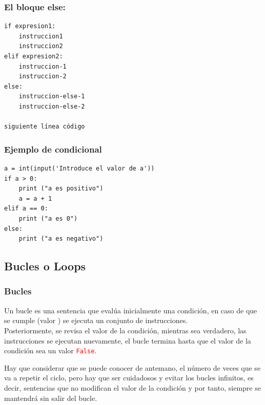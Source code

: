 \begin{frame}[fragile]
\frametitle{El bloque else:}
\begin{verbatim}
if expresion1:
    instruccion1
    instruccion2
elif expresion2:
    instruccion-1
    instruccion-2
else:
    instruccion-else-1
    instruccion-else-2

siguiente línea código
\end{verbatim}
\end{frame}
\begin{frame}[fragile]
\frametitle{Ejemplo de condicional}
\begin{lstlisting}[basicstyle=\linespread{1.2}\ttfamily\small, columns=fullflexible]
a = int(input('Introduce el valor de a'))
if a > 0:
    print ("a es positivo")
    a = a + 1
elif a == 0: 
    print ("a es 0")
else:
    print ("a es negativo")
\end{lstlisting}
\end{frame}
\subsection{Bucles o Loops}
\begin{frame}
\frametitle{Bucles}
Un bucle es una sentencia que evalúa inicialmente una condición, en caso de que se cumple (valor ) se ejecuta un conjunto de instrucciones.
\\
\bigskip
Posteriormente, se revisa el valor de la condición, mientras sea verdadero, las instrucciones se ejecutan nuevamente, el bucle termina hasta que el valor de la condición sea un valor \textcolor{red}{\texttt{False}}.
\end{frame}
\begin{frame}
Hay que considerar que se puede conocer de antemano, el número de veces que se va a repetir el ciclo, pero hay que ser cuidadosos y evitar los bucles infinitos, es decir, sentencias que no modifican el valor de la condición y por tanto, siempre se mantendrá sin salir del bucle.
\end{frame}
